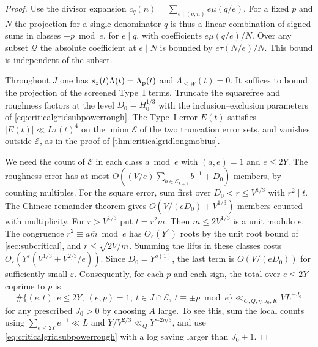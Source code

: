 \documentclass[11pt,a4paper]{article}
\numberwithin{equation}{section}
\begin{document}
\begin{proof}
Use the divisor expansion
$c_q(n)=\sum_{e\mid(q,n)}e\mu(q/e)$. For a fixed
$p$ and $N$ the projection for a single denominator
$q$ is thus a linear combination of signed sums in
classes $\pm p\bmod e$, for $e\mid q$, with coefficients
$e\mu(q/e)/N$. Over any subset $\mathcal Q$ the
absolute coefficient at $e\mid N$ is bounded by
$e\tau(N/e)/N$. This bound is independent of the
subset.

Throughout $J$ one has $s_z(t)\Lambda(t)=\Lambda_{\rm p}(t)$
and $\Lambda_{\le W}(t)=0$. It suffices to bound the
projection of the screened Type~I terms. Truncate the
squarefree and roughness factors at the level
$D_0=H_0^{1/3}$ with the inclusion--exclusion parameters
of \cref{eq:criticalgridsubpowerrough}. The Type~I
error $E(t)$ satisfies $|E(t)|\ll L\tau(t)^4$ on the
union $\mathcal E$ of the two truncation error sets,
and vanishes outside $\mathcal E$, as in the proof of
\cref{thm:criticalgridlongmobius}.

We need the count of $\mathcal E$ in each class
$a\bmod e$ with $(a,e)=1$ and $e\le2Y$.
The roughness error has at most
$O((V/e)\sum_{b\in\mathcal E_{k+1}}b^{-1}+D_0)$
members, by counting multiples. For the square
error, sum first over $D_0<r\le V^{1/3}$ with
$r^2\mid t$. The Chinese remainder theorem gives
$O(V/(eD_0)+V^{1/3})$ members counted with
multiplicity. For $r>V^{1/3}$ put $t=r^2 m$.
Then $m\le2V^{1/3}$ is a unit modulo $e$.
The congruence $r^2\equiv a\overline m\bmod e$
has $O_\varepsilon(Y^\varepsilon)$ roots
by the unit root bound of \cref{sec:subcritical},
and $r\le\sqrt{2V/m}$. Summing the lifts in
these classes costs
$O_\varepsilon(Y^\varepsilon(V^{1/3}+V^{2/3}/e))$.
Since $D_0=Y^{o(1)}$, the last term is
$O(V/(eD_0))$ for sufficiently small $\varepsilon$.
Consequently, for each $p$ and each sign, the
total over $e\le2Y$ coprime to $p$ is
\begin{equation}
 \#\{(e,t):e\le2Y,\ (e,p)=1,\ t\in J\cap\mathcal E,\
                            t\equiv\pm p\bmod e\}
       \ll_{C,Q,\eta,J_0,K} V L^{-J_0}
 \label{eq:criticalgridprojectionbad}
\end{equation}
for any prescribed $J_0>0$ by choosing $A$ large.
To see this, sum the local counts using
$\sum_{e\le 2Y}e^{-1}\ll L$ and
$Y/V^{2/3}\ll_Q Y^{-2\eta/3}$, and use
\cref{eq:criticalgridsubpowerrough} with a log
saving larger than $J_0+1$.


\end{proof}
\end{document}

